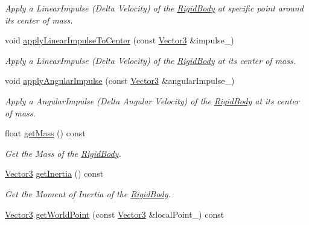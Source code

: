 \begin{DoxyCompactItemize}
\begin{DoxyCompactList}\small\item\em Apply a Linear\+Impulse (Delta Velocity) of the \hyperlink{class_i_dream_sky_1_1_physics3_1_1_rigid_body}{Rigid\+Body} at specific point around its center of mass. \end{DoxyCompactList}\item 
void \hyperlink{class_i_dream_sky_1_1_physics3_1_1_rigid_body_a791761a4c6d234811140ad4698ef4a6f}{apply\+Linear\+Impulse\+To\+Center} (const \hyperlink{class_i_dream_sky_1_1_vector3}{Vector3} \&impulse\+\_\+)
\begin{DoxyCompactList}\small\item\em Apply a Linear\+Impulse (Delta Velocity) of the \hyperlink{class_i_dream_sky_1_1_physics3_1_1_rigid_body}{Rigid\+Body} at its center of mass. \end{DoxyCompactList}\item 
void \hyperlink{class_i_dream_sky_1_1_physics3_1_1_rigid_body_a14008559db22c483b4d2aa1e0f18c5b6}{apply\+Angular\+Impulse} (const \hyperlink{class_i_dream_sky_1_1_vector3}{Vector3} \&angular\+Impulse\+\_\+)
\begin{DoxyCompactList}\small\item\em Apply a Angular\+Impulse (Delta Angular Velocity) of the \hyperlink{class_i_dream_sky_1_1_physics3_1_1_rigid_body}{Rigid\+Body} at its center of mass. \end{DoxyCompactList}\item 
float \hyperlink{class_i_dream_sky_1_1_physics3_1_1_rigid_body_a3a97500df9a0b01efee57289bac19df4}{get\+Mass} () const 
\begin{DoxyCompactList}\small\item\em Get the Mass of the \hyperlink{class_i_dream_sky_1_1_physics3_1_1_rigid_body}{Rigid\+Body}. \end{DoxyCompactList}\item 
\hyperlink{class_i_dream_sky_1_1_vector3}{Vector3} \hyperlink{class_i_dream_sky_1_1_physics3_1_1_rigid_body_a8e1a4453fc4a842231073803bb22234c}{get\+Inertia} () const 
\begin{DoxyCompactList}\small\item\em Get the Moment of Inertia of the \hyperlink{class_i_dream_sky_1_1_physics3_1_1_rigid_body}{Rigid\+Body}. \end{DoxyCompactList}\item 
\hyperlink{class_i_dream_sky_1_1_vector3}{Vector3} \hyperlink{class_i_dream_sky_1_1_physics3_1_1_rigid_body_a21168759e6e9c167779515f0cc7889eb}{get\+World\+Point} (const \hyperlink{class_i_dream_sky_1_1_vector3}{Vector3} \&local\+Point\+\_\+) const 

\end{DoxyCompactItemize}
